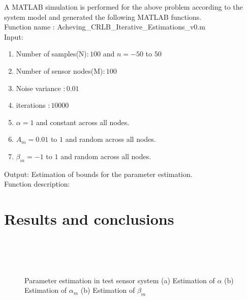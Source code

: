 \documentclass[12pt]{article}
\begin{document}
A MATLAB simulation is performed for the above problem according to the system model and generated the following MATLAB functions.\\
Function name : Acheving\_CRLB\_Iterative\_Estimations\_v$0$.m\\
Input:
\begin{enumerate}
\item Number of samples(N)$: 100$ and $n=-50$ to $50$
\item Number of sensor nodes(M)$: 100$ 
\item Noise variance          $: 0.01$ 
\item iterations          $: 10000$ 
\item $\alpha = 1$ and constant across all nodes.          
\item $A_{m} = 0.01 $ to $1$  and random across all nodes.    
\item $\beta_{m} = -1 $ to $1$  and random across all nodes.  
\end{enumerate}
Output: Estimation of bounds for the parameter estimation.\\
Function description:

\section{Results and conclusions}
 \begin{figure}
     \centering
{}\\
\\
\\
\caption{ Parameter estimation in test sensor system (a) Estimation of $\alpha$ (b)  Estimation of $\alpha_{m}$ (b) Estimation of $\beta_{m}$ }
\label{carrdh}
\end{figure}



\newpage
\end{document}
